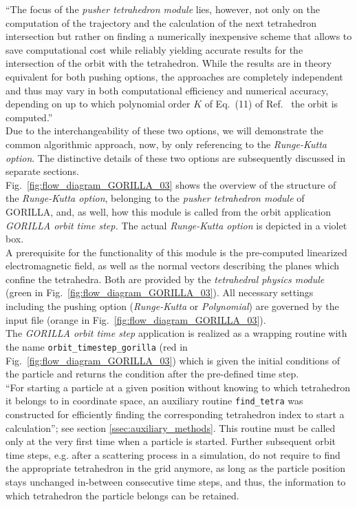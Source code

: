 \documentclass{TheMartianReport}
\begin{document}
``The focus of the \textit{pusher tetrahedron module} lies, however, not only on the computation of the trajectory and the calculation of the next tetrahedron intersection but rather on finding a numerically inexpensive scheme that allows to save computational cost while reliably yielding accurate results for the intersection of the orbit with the tetrahedron. While the results are in theory equivalent for both pushing options, the approaches are completely independent and thus may vary in both computational efficiency and numerical accuracy, depending on up to which polynomial order $K$ of Eq.~(11) of Ref.~ the orbit is computed.''\cite{bauer_master_2020} \\
%
Due to the interchangeability of these two options, we will demonstrate the common algorithmic approach, now, by only referencing to the \textit{Runge-Kutta option}. The distinctive details of these two options are subsequently discussed in separate sections. \\
%
Fig.~\ref{fig:flow_diagram_GORILLA_03} shows the overview of the structure of the \textit{Runge-Kutta option}, belonging to the \textit{pusher tetrahedron module} of GORILLA, and, as well, how this module is called from the orbit application \textit{GORILLA orbit time step.} The actual \textit{Runge-Kutta option} is depicted in a violet box. \\
%
A prerequisite for the functionality of this module is the pre-computed linearized electromagnetic field, as well as the normal vectors describing the planes which confine the tetrahedra. Both are provided by the \textit{tetrahedral physics module} (green in Fig.~\ref{fig:flow_diagram_GORILLA_03}). All necessary settings including the pushing option (\textit{Runge-Kutta} or \textit{Polynomial}) are governed by the input file (orange in Fig.~\ref{fig:flow_diagram_GORILLA_03}).\\
%
The \textit{GORILLA orbit time step} application is realized as a wrapping routine with the name \texttt{orbit\_timestep\_gorilla} (red in Fig.~\ref{fig:flow_diagram_GORILLA_03}) which is given the initial conditions of the particle and returns the condition after the pre-defined time step.\\
%
``For starting a particle at a given position without knowing to which tetrahedron it belongs to in coordinate space, an auxiliary routine \texttt{find\_tetra} was constructed for efficiently finding the corresponding tetrahedron index to start a calculation''\cite{bauer_master_2020}; see section \ref{ssec:auxiliary_methods}.  This routine must be called only at the very first time when a particle is started.  Further subsequent orbit time steps, e.g.  after a scattering process in a simulation, do not require to find the appropriate tetrahedron in the grid anymore, as long as the particle position stays unchanged in-between consecutive time steps, and thus, the information to which tetrahedron the particle belongs can be retained.\\
\end{document}
